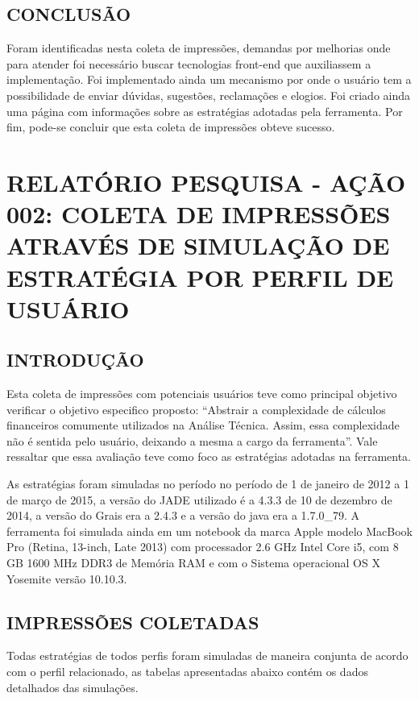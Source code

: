 \begin{apendicesenv}
\section{CONCLUSÃO} 

Foram identificadas nesta coleta de impressões, demandas por melhorias onde para atender foi necessário buscar tecnologias front-end que auxiliassem a implementação. Foi implementado ainda um mecanismo por onde o usuário tem a possibilidade de enviar dúvidas, sugestões, reclamações e elogios. Foi criado ainda uma página com informações sobre as estratégias adotadas pela ferramenta. Por fim, pode-se concluir que esta coleta de impressões obteve sucesso. 

\chapter{RELATÓRIO PESQUISA - AÇÃO 002: COLETA DE IMPRESSÕES ATRAVÉS DE SIMULAÇÃO DE ESTRATÉGIA POR PERFIL DE USUÁRIO}
\section{INTRODUÇÃO}

Esta coleta de impressões com potenciais usuários teve como principal objetivo verificar  o objetivo especifico proposto: “Abstrair a complexidade de cálculos financeiros comumente utilizados na Análise Técnica. Assim, essa complexidade não é sentida pelo usuário, deixando a mesma a cargo da ferramenta”. Vale ressaltar que essa avaliação teve como foco as estratégias adotadas na ferramenta.

As estratégias foram simuladas no período no período de 1 de janeiro de 2012 a 1 de março de 2015, a versão do JADE utilizado é a 4.3.3 de 10 de dezembro de 2014, a versão do Grais era a 2.4.3 e a versão do java era a 1.7.0\_79. A ferramenta foi simulada ainda em um notebook da marca Apple modelo MacBook Pro (Retina, 13-inch, Late 2013) com processador 2.6 GHz Intel Core i5, com 8 GB 1600 MHz DDR3 de Memória RAM e com o Sistema operacional OS X Yosemite versão 10.10.3.

\section{IMPRESSÕES COLETADAS}

Todas estratégias de todos perfis foram simuladas de maneira conjunta de acordo com o perfil relacionado, as tabelas apresentadas abaixo contém os dados detalhados das simulações.


\end{apendicesenv}
